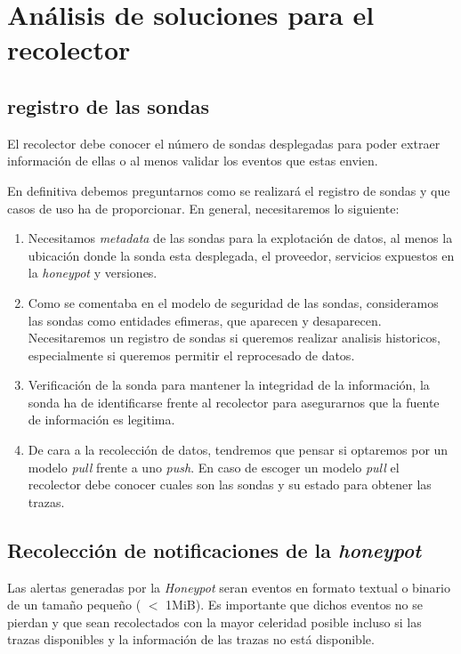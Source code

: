 \section{Análisis de soluciones para el recolector}


\subsection{registro de las sondas}

El recolector debe conocer el número de sondas desplegadas para poder extraer información de ellas o al menos validar
los eventos que estas envien.

En definitiva debemos preguntarnos como se realizará el registro de sondas y que casos de uso ha de proporcionar. En general, necesitaremos lo siguiente:

\begin{enumerate}
    \item Necesitamos \emph{metadata} de las sondas para la explotación de datos, al menos la ubicación donde la sonda esta desplegada, el proveedor, servicios expuestos en la \emph{honeypot} y versiones.
    \item Como se comentaba en el modelo de seguridad de las sondas, consideramos las sondas como entidades efimeras, que aparecen y desaparecen. 
    Necesitaremos un registro de sondas si queremos realizar analisis historicos, especialmente si queremos permitir el reprocesado de datos.
    \item Verificación de la sonda para mantener la integridad de la información, la sonda ha de identificarse frente al recolector para asegurarnos que la fuente de información es legitima.
    \item De cara a la recolección de datos, tendremos que pensar si optaremos por un modelo \emph{pull} frente a uno \emph{push}. En caso de escoger un modelo \emph{pull} el recolector debe conocer
    cuales son las sondas y su estado para obtener las trazas.
\end{enumerate}

\subsection{Recolección de notificaciones de la \emph{honeypot}}

Las alertas generadas por la \emph{Honeypot} seran eventos en formato textual o binario de un tamaño pequeño ( $<$ 1MiB). 
Es importante que dichos eventos no se pierdan y que sean recolectados con la mayor celeridad posible incluso si las trazas disponibles
y la información de las trazas no está disponible.

